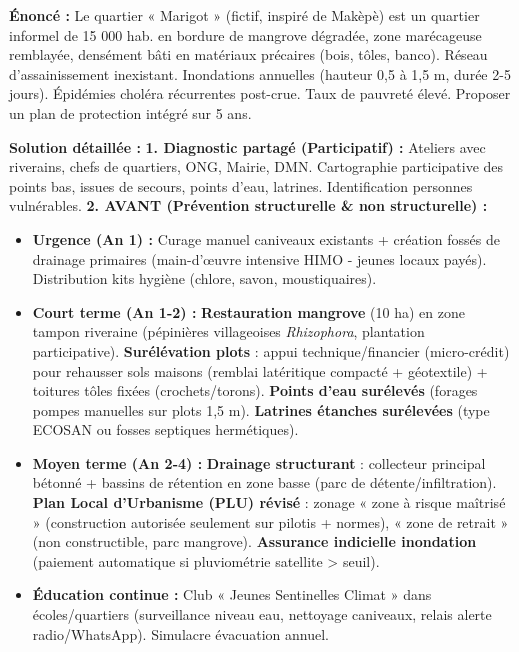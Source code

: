 \documentclass[11pt]{article}
\begin{document}
\begin{exoresolu}
\textbf{Énoncé :} Le quartier « Marigot » (fictif, inspiré de Makèpè) est un quartier informel de 15 000 hab. en bordure de mangrove dégradée, zone marécageuse remblayée, densément bâti en matériaux précaires (bois, tôles, banco). Réseau d'assainissement inexistant. Inondations annuelles (hauteur 0,5 à 1,5 m, durée 2-5 jours). Épidémies choléra récurrentes post-crue. Taux de pauvreté élevé. Proposer un plan de protection intégré sur 5 ans.

\tcblower

\textbf{Solution détaillée :}
\textbf{1. Diagnostic partagé (Participatif) :} Ateliers avec riverains, chefs de quartiers, ONG, Mairie, DMN. Cartographie participative des points bas, issues de secours, points d'eau, latrines. Identification personnes vulnérables.
\textbf{2. AVANT (Prévention structurelle \& non structurelle) :}
\begin{itemize}
    \item \textbf{Urgence (An 1) :} Curage manuel caniveaux existants + création fossés de drainage primaires (main-d'œuvre intensive HIMO - jeunes locaux payés). Distribution kits hygiène (chlore, savon, moustiquaires).
    \item \textbf{Court terme (An 1-2) :} \textbf{Restauration mangrove} (10 ha) en zone tampon riveraine (pépinières villageoises \emph{Rhizophora}, plantation participative). \textbf{Surélévation plots} : appui technique/financier (micro-crédit) pour rehausser sols maisons (remblai latéritique compacté + géotextile) + toitures tôles fixées (crochets/torons). \textbf{Points d'eau surélevés} (forages pompes manuelles sur plots 1,5 m). \textbf{Latrines étanches surélevées} (type ECOSAN ou fosses septiques hermétiques).
    \item \textbf{Moyen terme (An 2-4) :} \textbf{Drainage structurant} : collecteur principal bétonné + bassins de rétention en zone basse (parc de détente/infiltration). \textbf{Plan Local d'Urbanisme (PLU) révisé} : zonage « zone à risque maîtrisé » (construction autorisée seulement sur pilotis + normes), « zone de retrait » (non constructible, parc mangrove). \textbf{Assurance indicielle inondation} (paiement automatique si pluviométrie satellite > seuil).
    \item \textbf{Éducation continue :} Club « Jeunes Sentinelles Climat » dans écoles/quartiers (surveillance niveau eau, nettoyage caniveaux, relais alerte radio/WhatsApp). Simulacre évacuation annuel.

\end{itemize}
\end{exoresolu}
\end{document}
